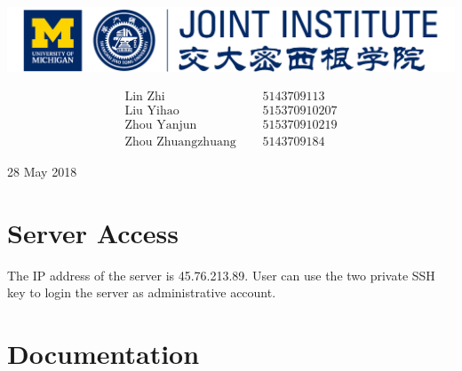 \documentclass[a4paper,12pt]{article}
\begin{document}
	
	\vspace*{0.25cm}
	\begin{center}
		\includegraphics[scale=0.9]{LOGO.png}
	\end{center}
	
	\thispagestyle{empty}
	
	\begin{center}
		
		\hrulefill
		
		\vspace*{5cm}
		\begin{Huge}
		\end{Huge}
		
		\vspace{1em}

	\end{center}
	
	\vfill
	
	\begin{center}
		\begin{align*}			
		\text{Lin Zhi } & \quad 5143709113\\[0.5em]
		\text{Liu Yihao } & \quad 515370910207\\[0.5em]
		\text{Zhou Yanjun } & \quad515370910219\\[0.5em]
		\text{Zhou Zhuangzhuang } & \quad 5143709184
		\end{align*}
	\end{center}
	\vspace*{3cm}
	\begin{center}
		28 May 2018 
	\end{center}
	
	\newpage
	
	
	\section{Server Access}
	The IP address of the server is 45.76.213.89. User can use the two private SSH key to login the server as administrative account.
	
	\section{Documentation}
\end{document}
